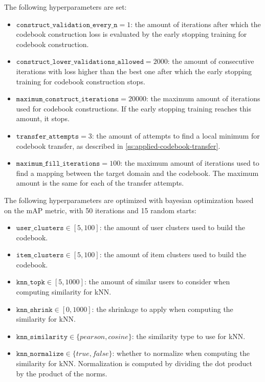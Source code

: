 The following hyperparameters are set:
\begin{itemize}
\item $\texttt{construct\_validation\_every\_n} = 1$: the amount of iterations after which the codebook construction loss is evaluated by the early stopping training for codebook construction.
\item $\texttt{construct\_lower\_validations\_allowed} = 2000$: the amount of consecutive iterations with loss higher than the best one after which the early stopping training for codebook construction stops.
\item $\texttt{maximum\_construct\_iterations} = 20000$: the maximum amount of iterations used for codebook constructions. If the early stopping training reaches this amount, it stops.
\item $\texttt{transfer\_attempts} = 3$: the amount of attempts to find a local minimum for codebook transfer, as described in \autoref{ss:applied-codebook-transfer}.
\item $\texttt{maximum\_fill\_iterations} = 100$: the maximum amount of iterations used to find a mapping between the target domain and the codebook. The maximum amount is the same for each of the transfer attempts.
\end{itemize}
The following hyperparameters are optimized with bayesian optimization based on the mAP metric, with 50 iterations and 15 random starts:
\begin{itemize}
\item $\texttt{user\_clusters} \in [5,100]$: the amount of user clusters used to build the codebook.
\item $\texttt{item\_clusters} \in [5,100]$: the amount of item clusters used to build the codebook.
\item $\texttt{knn\_topk} \in [5,1000]$: the amount of similar users to consider when computing similarity for kNN.
\item $\texttt{knn\_shrink} \in [0,1000]$: the shrinkage to apply when computing the similarity for kNN.
\item $\texttt{knn\_similarity} \in \{pearson,cosine\}$: the similarity type to use for kNN.
\item $\texttt{knn\_normalize} \in \{true,false\}$: whether to normalize when computing the similarity for kNN. Normalization is computed by dividing the dot product by the product of the norms.
\end{itemize}

\clearpage


